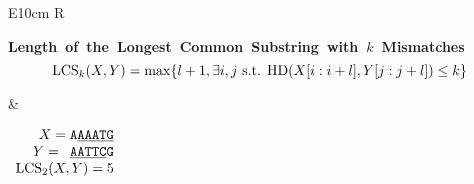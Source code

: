 \begin{table}
{\begin{tabularx}{\textwidth}{E{10cm}   R}
    \begin{minipage}{10cm} \renewcommand{\arraystretch}{1}
        \small \mbox{\textbf{Length of the Longest Common Substring with $k$ Mismatches}} \\
        $$ \mathrm{LCS}_{k}(X,Y)= \max \{ l+1, \exists i,j \mbox{ s.t. } \mathrm{HD}(X[i:i+l],Y[j:j+l]) \leq k \}$$
        \end{minipage}
        &
        \hfill
        \begin{minipage}{4cm} \renewcommand{\arraystretch}{1}
            \hfill
        $\begin{array}{r}
            X= \mathrm{\texttt{A\underline{AAATG}}}\\
            Y= \mathrm{\texttt{~\underline{AATTC}G}}\\
            \mathrm{LCS}_2(X,Y)=5
        \end{array}$
    \end{minipage}\\
    \end{tabularx}
    }
    \caption{Example for various similarities, in bold those we study in this thesis, for a given metric $d:\Sigma \times \Sigma \rightarrow \mathbb{Z}^{+}$ over the alphabet. For two given strings $X$ and $Y$ and two integers $0 \leq i < |X|$ and $0 \leq j < |X|$, $X_i$ and $Y_j$ denote the prefixes of $X$ and $Y$ of length $i$ and $j$ respectively.}
    \label{fig:intro:similarities}
\end{table}
\renewcommand{\arraystretch}{1}